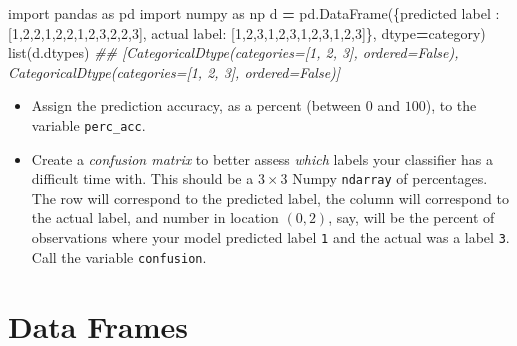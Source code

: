 \documentclass[
  12pt,
  krantz2]{krantz}
\makeatletter
\newenvironment{Shaded}{\begin{snugshade}}{\end{snugshade}}
\newcommand{\BuiltInTok}[1]{#1}
\newcommand{\CommentTok}[1]{\textcolor[rgb]{0.37,0.37,0.37}{\textit{#1}}}
\newcommand{\DecValTok}[1]{\textcolor[rgb]{0.06,0.06,0.06}{#1}}
\newcommand{\ImportTok}[1]{#1}
\newcommand{\NormalTok}[1]{#1}
\newcommand{\OperatorTok}[1]{\textcolor[rgb]{0.43,0.43,0.43}{\textbf{#1}}}
\newcommand{\StringTok}[1]{\textcolor[rgb]{0.5,0.5,0.5}{#1}}
\providecommand{\tightlist}{%
  \setlength{\itemsep}{0pt}\setlength{\parskip}{0pt}}
\newenvironment{kframe}{%
\medskip{}
\setlength{\fboxsep}{.8em}
 \def\at@end@of@kframe{}%
 \ifinner\ifhmode%
  \def\at@end@of@kframe{\end{minipage}}%
  \begin{minipage}{\columnwidth}%
 \fi\fi%
 \def\FrameCommand##1{\hskip\@totalleftmargin \hskip-\fboxsep
 \colorbox{shadecolor}{##1}\hskip-\fboxsep
     \hskip-\linewidth \hskip-\@totalleftmargin \hskip\columnwidth}%
 \MakeFramed {\advance\hsize-\width
   \@totalleftmargin\z@ \linewidth\hsize
   \@setminipage}}%
 {\par\unskip\endMakeFramed%
 \at@end@of@kframe}
\renewenvironment{Shaded}{\begin{kframe}}{\end{kframe}}
\makeatother
\begin{document}
\begin{Shaded}
\begin{Highlighting}[]
\ImportTok{import}\NormalTok{ pandas }\ImportTok{as}\NormalTok{ pd}
\ImportTok{import}\NormalTok{ numpy }\ImportTok{as}\NormalTok{ np}
\NormalTok{d }\OperatorTok{=}\NormalTok{ pd.DataFrame(\{}\StringTok{\textquotesingle{}predicted label\textquotesingle{}}\NormalTok{ : [}\DecValTok{1}\NormalTok{,}\DecValTok{2}\NormalTok{,}\DecValTok{2}\NormalTok{,}\DecValTok{1}\NormalTok{,}\DecValTok{2}\NormalTok{,}\DecValTok{2}\NormalTok{,}\DecValTok{1}\NormalTok{,}\DecValTok{2}\NormalTok{,}\DecValTok{3}\NormalTok{,}\DecValTok{2}\NormalTok{,}\DecValTok{2}\NormalTok{,}\DecValTok{3}\NormalTok{], }
                  \StringTok{\textquotesingle{}actual label\textquotesingle{}}\NormalTok{: [}\DecValTok{1}\NormalTok{,}\DecValTok{2}\NormalTok{,}\DecValTok{3}\NormalTok{,}\DecValTok{1}\NormalTok{,}\DecValTok{2}\NormalTok{,}\DecValTok{3}\NormalTok{,}\DecValTok{1}\NormalTok{,}\DecValTok{2}\NormalTok{,}\DecValTok{3}\NormalTok{,}\DecValTok{1}\NormalTok{,}\DecValTok{2}\NormalTok{,}\DecValTok{3}\NormalTok{]\}, }
\NormalTok{                 dtype}\OperatorTok{=}\StringTok{\textquotesingle{}category\textquotesingle{}}\NormalTok{)}
\BuiltInTok{list}\NormalTok{(d.dtypes)}
\CommentTok{\#\# [CategoricalDtype(categories=[1, 2, 3], ordered=False), CategoricalDtype(categories=[1, 2, 3], ordered=False)]}
\end{Highlighting}
\end{Shaded}

\begin{itemize}
\tightlist
\item
  Assign the prediction accuracy, as a percent (between \(0\) and \(100\)), to the variable \texttt{perc\_acc}.
\item
  Create a \emph{confusion matrix} to better assess \emph{which} labels your classifier has a difficult time with. This should be a \(3 \times 3\) Numpy \texttt{ndarray} of percentages. The row will correspond to the predicted label, the column will correspond to the actual label, and number in location \((0,2)\), say, will be the percent of observations where your model predicted label \texttt{1} and the actual was a label \texttt{3}. Call the variable \texttt{confusion}.
\end{itemize}

\hypertarget{data-frames}{%
\chapter{Data Frames}\label{data-frames}}
\end{document}
